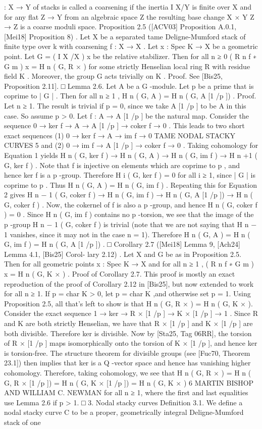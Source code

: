\documentclass{article}
\begin{document}
: X → Y of stacks is called a coarsening if the inertia I X/Y is finite over X and for any flat Z → Y from an algebraic space Z the resulting base change X × Y Z → Z is a coarse moduli space. Proposition 2.5 ([ACV03] Proposition A.0.1, [Mei18] Proposition 8) . Let X be a separated tame Deligne-Mumford stack of finite type over k with coarsening f : X → X . Let x : Spec K → X be a geometric point. Let G = ( I X /X ) x be the relative stabilizer. Then for all n ≥ 0 ( R n f ∗ G m ) x = H n ( G, R × ) for some strictly Henselian local ring R with residue field K . Moreover, the group G acts trivially on K . Proof. See [Bis25, Proposition 2.11]. □ Lemma 2.6. Let A be a G -module. Let p be a prime that is coprime to | G | . Then for all n ≥ 1 , H n ( G, A ) = H n ( G, A [1 /p ]) . Proof. Let n ≥ 1. The result is trivial if p = 0, since we take A [1 /p ] to be A in this case. So assume p > 0. Let f : A → A [1 /p ] be the natural map. Consider the sequence 0 → ker f → A → A [1 /p ] → coker f → 0 . This leads to two short exact sequences (1) 0 → ker f → A → im f → 0 TAME NODAL STACKY CURVES 5 and (2) 0 → im f → A [1 /p ] → coker f → 0 . Taking cohomology for Equation 1 yields H n ( G, ker f ) → H n ( G, A ) → H n ( G, im f ) → H n +1 ( G, ker f ) . Note that f is injective on elements which are coprime to p , and hence ker f is a p -group. Therefore H i ( G, ker f ) = 0 for all i ≥ 1, since | G | is coprime to p . Thus H n ( G, A ) = H n ( G, im f ) . Repeating this for Equation 2 gives H n − 1 ( G, coker f ) → H n ( G, im f ) → H n ( G, A [1 /p ]) → H n ( G, coker f ) . Now, the cokernel of f is also a p -group, and hence H n ( G, coker f ) = 0 . Since H n ( G, im f ) contains no p -torsion, we see that the image of the p -group H n − 1 ( G, coker f ) is trivial (note that we are not saying that H n − 1 vanishes, since it may not in the case n = 1). Therefore H n ( G, A ) = H n ( G, im f ) = H n ( G, A [1 /p ]) . □ Corollary 2.7 ([Mei18] Lemma 9, [Ach24] Lemma 4.1, [Bis25] Corol- lary 2.12) . Let X and G be as in Proposition 2.5. Then for all geometric points x : Spec K → X and for all n ≥ 1 , ( R n f ∗ G m ) x = H n ( G, K × ) . Proof of Corollary 2.7. This proof is mostly an exact reproduction of the proof of Corollary 2.12 in [Bis25], but now extended to work for all n ≥ 1. If p = char K > 0, let p = char K ,and otherwise set p = 1. Using Proposition 2.5, all that’s left to show is that H n ( G, R × ) = H n ( G, K × ). Consider the exact sequence 1 → ker → R × [1 /p ] → K × [1 /p ] → 1 . Since R and K are both strictly Henselian, we have that R × [1 /p ] and K × [1 /p ] are both divisible. Therefore ker is divisible. Now by [Sta25, Tag 06RR], the torsion of R × [1 /p ] maps isomorphically onto the torsion of K × [1 /p ], and hence ker is torsion-free. The structure theorem for divisible groups (see [Fuc70, Theorem 23.1]) then implies that ker is a Q -vector space and hence has vanishing higher cohomology. Therefore, taking cohomology, we see that H n ( G, R × ) = H n ( G, R × [1 /p ]) = H n ( G, K × [1 /p ]) = H n ( G, K × ) 6 MARTIN BISHOP AND WILLIAM C. NEWMAN for all n ≥ 1, where the first and last equalities use Lemma 2.6 if p > 1. □ 3. Nodal stacky curves Definition 3.1. We define a nodal stacky curve C to be a proper, geometrically integral Deligne-Mumford stack of one 
\end{document}

